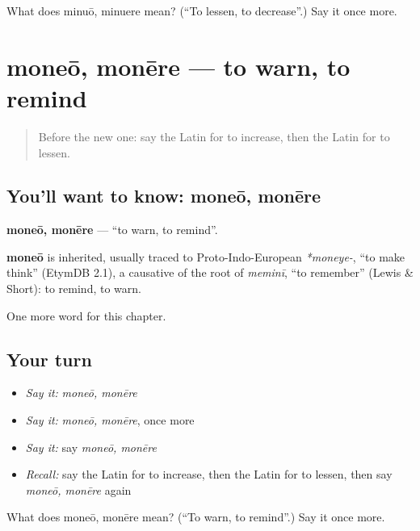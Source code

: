\begin{tcolorbox}[breakable,colback=teal!4,colframe=teal!35!black,title={Before you move on}]
What does minuō, minuere mean? (\textquotedblleft{}To lessen, to decrease\textquotedblright{}.) Say it once more.
\end{tcolorbox}
\section[moneō, monēre]{moneō, monēre — to warn, to remind}

\label{lesson:LA-C256-moneo}



\begin{quote}
Before the new one: say the Latin for to increase, then the Latin for to lessen.
\end{quote}

\subsection*{You'll want to know: moneō, monēre}
\textbf{moneō, monēre} — \textquotedblleft{}to warn, to remind\textquotedblright{}.

\begin{cousinweb}
\textbf{moneō} is inherited, usually traced to Proto-Indo-European \emph{*moneye-}, \textquotedblleft{}to make think\textquotedblright{} (EtymDB 2.1), a causative of the root of \emph{meminī}, \textquotedblleft{}to remember\textquotedblright{} (Lewis \& Short): to remind, to warn.
\end{cousinweb}

\begin{grammarlens}[title={What you've built}]
One more word for this chapter.
\end{grammarlens}

\subsection*{Your turn}
\begin{itemize}
\raggedright
  \item \emph{Say it:} \emph{moneō, monēre}
  \item \emph{Say it:} \emph{moneō, monēre}, once more
  \item \emph{Say it:} say \emph{moneō, monēre}
  \item \emph{Recall:} say the Latin for to increase, then the Latin for to lessen, then say \emph{moneō, monēre} again
\end{itemize}

\begin{tcolorbox}[breakable,colback=teal!4,colframe=teal!35!black,title={Before you move on}]
What does moneō, monēre mean? (\textquotedblleft{}To warn, to remind\textquotedblright{}.) Say it once more.
\end{tcolorbox}
